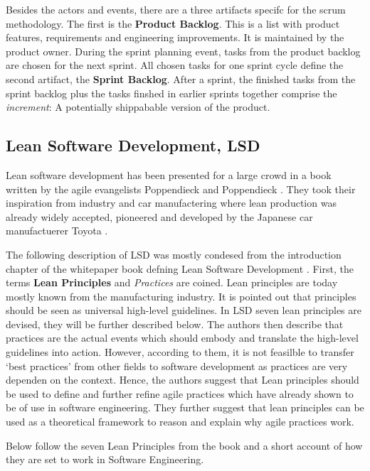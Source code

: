 \documentclass[a4paper,11pt,twoside]{article}
\begin{document}
Besides the actors and events, there are a three artifacts specifc for the scrum methodology. The first is the \textbf{Product Backlog}. This is a list with product features, requirements and engineering improvements. It is maintained by the product owner. During the sprint planning event, tasks from the product backlog are chosen for the next sprint. All chosen tasks for one sprint cycle define the second artifact, the \textbf{Sprint Backlog}. After a sprint, the finished tasks from the sprint backlog plus the tasks finshed in earlier sprints together comprise the \textit{increment}: A potentially shippabable version of the product.  



\subsection{Lean Software Development, LSD}
Lean software development has been presented for a large crowd in a book written by the agile evangelists Poppendieck and Poppendieck \cite{poppendieck2003}. They took their inspiration from industry and car manufactering where lean production was already widely accepted, pioneered and developed by the Japanese car manufactuerer Toyota \cite{toyota}.

The following description of LSD was mostly condesed from the introduction chapter of the whitepaper book defning Lean Software Development \cite{poppendieck2003}. First, the terms \textbf{Lean Principles} and \textit{Practices} are coined. Lean principles are today mostly known from the manufacturing industry. It is pointed out that principles should be seen as universal high-level guidelines. In LSD seven lean principles are devised, they will be further described below. The authors then describe that practices are the actual events which should embody and translate the high-level guidelines into action. However, according to them, it is not feasilble to transfer `best practices' from other fields to software development as practices are very dependen on the context. Hence, the authors suggest that Lean principles should be used to define and further refine agile practices which have already shown to be of use in software engineering. They further suggest that lean principles can be used as a theoretical framework to reason and explain why agile practices work.

Below follow the seven Lean Principles from the book and a short account of how they are set to work in Software Engineering.
\end{document}
